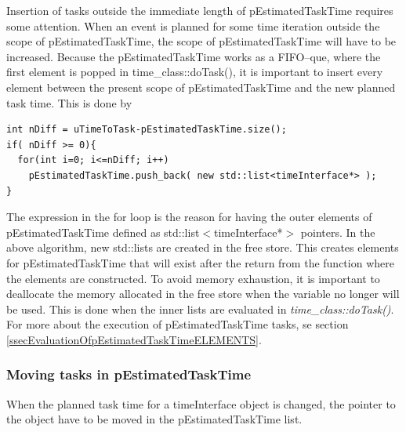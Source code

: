 	Insertion of tasks outside the immediate length of pEstimatedTaskTime requires some attention.
	When an event is planned for some time iteration outside the scope of pEstimatedTaskTime, the scope of pEstimatedTaskTime will have to be increased.
	Because the pEstimatedTaskTime works as a FIFO--que, where the first element %
		is popped in time\_class::doTask(), it is important to insert every element between the present scope of pEstimatedTaskTime and the new planned task time.
	This is done by
\begin{lstlisting}
int nDiff = uTimeToTask-pEstimatedTaskTime.size();
if( nDiff >= 0){
  for(int i=0; i<=nDiff; i++)
    pEstimatedTaskTime.push_back( new std::list<timeInterface*> );
}
\end{lstlisting}
The expression in the for loop is the reason for having the outer elements of pEstimatedTaskTime defined as std::list$<$timeInterface*$>$ pointers.
In the above algorithm, new std::lists are created in the free store. This creates elements for pEstimatedTaskTime that will exist after the return from the function where the elements are constructed.
To avoid memory exhaustion, it is important to deallocate the memory allocated in the free store when the variable no longer will be used. This is done when the inner lists are evaluated in \emph{time\_class::doTask()}.
For more about the execution of pEstimatedTaskTime tasks, se section \ref{ssecEvaluationOfpEstimatedTaskTimeELEMENTS}.





%

	\subsubsection{Moving tasks in pEstimatedTaskTime}
	When the planned task time for a timeInterface object is changed, the pointer to the object have to be moved in the pEstimatedTaskTime list.
	
